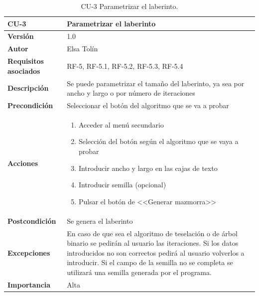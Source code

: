 \begin{table}[p]
	\centering
	\begin{tabularx}{\linewidth}{ p{} p{} }
			\toprule
			\textbf{CU-3}    & \textbf{Parametrizar el laberinto}\\
			\toprule
			\textbf{Versión}              & 1.0    \\
			\textbf{Autor}                & Elsa Tolín \\
			\textbf{Requisitos asociados} & RF-5, RF-5.1, RF-5.2, RF-5.3, RF-5.4 \\
			\textbf{Descripción}          & Se puede parametrizar el tamaño del laberinto, ya sea por ancho y largo o por número de iteraciones\\
			\textbf{Precondición}         & Seleccionar el botón del algoritmo que se va a probar\\
			\textbf{Acciones}             &
			\begin{enumerate}
					\def\labelenumi{\arabic{enumi}.}
					\tightlist
					\item Acceder al menú secundario
					\item Selección del botón según el algoritmo que se vaya a probar
                    \item Introducir ancho y largo en las cajas de texto
                    \item Introducir semilla (opcional)
                    \item Pulsar el botón de <<Generar mazmorra>>
				\end{enumerate}\\
			\textbf{Postcondición}        & Se genera el laberinto \\
			\textbf{Excepciones}          &  En caso de que sea el algoritmo de teselación o de árbol binario se pedirán al usuario las iteraciones. Si los datos introducidos no son correctos pedirá al usuario volverlos a introducir. Si el campo de la semilla no se completa se utilizará una semilla generada por el programa.\\
			\textbf{Importancia}          & Alta\\
			\bottomrule
		\end{tabularx}
	\caption{CU-3 Parametrizar el laberinto.}
\end{table}


